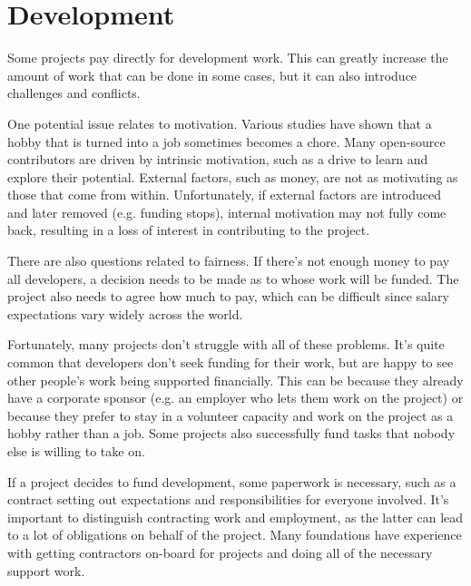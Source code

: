 


\chapter{Development}

Some projects pay directly for development work.  This can greatly increase the amount of work that can be done in some cases, but it can also introduce challenges and conflicts.

One potential issue relates to motivation.  Various studies have shown that a hobby that is turned into a job sometimes becomes a chore.  Many open-source contributors are driven by intrinsic motivation, such as a drive to learn and explore their potential.  External factors, such as money, are not as motivating as those that come from within.  Unfortunately, if external factors are introduced and later removed (e.g. funding stops), internal motivation may not fully come back, resulting in a loss of interest in contributing to the project.

There are also questions related to fairness.  If there's not enough money to pay all developers, a decision needs to be made as to whose work will be funded.  The project also needs to agree how much to pay, which can be difficult since salary expectations vary widely across the world.

Fortunately, many projects don't struggle with all of these problems.  It's quite common that developers don't seek funding for their work, but are happy to see other people's work being supported financially.  This can be because they already have a corporate sponsor (e.g. an employer who lets them work on the project) or because they prefer to stay in a volunteer capacity and work on the project as a hobby rather than a job.  Some projects also successfully fund tasks that nobody else is willing to take on.

If a project decides to fund development, some paperwork is necessary, such as a contract setting out expectations and responsibilities for everyone involved.  It's important to distinguish contracting work and employment, as the latter can lead to a lot of obligations on behalf of the project.  Many foundations have experience with getting contractors on-board for projects and doing all of the necessary support work.

